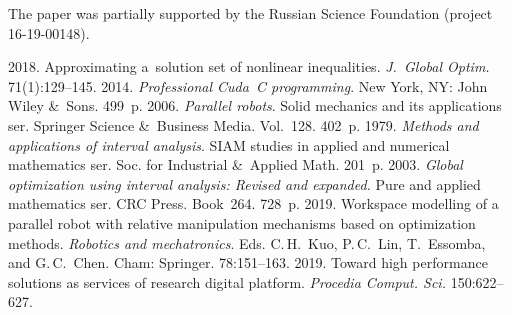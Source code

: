 




\Ack
\noindent
The paper was partially supported by the Russian Science Foundation  (project  16-19-00148).


 \begin{multicols}{2}

\renewcommand{\bibname}{\protect\rmfamily References}

{\small\frenchspacing
 {%
 \begin{thebibliography}{9}
 2018. Approximating 
a~solution set of nonlinear inequalities. \textit{J.~Global Optim.} 71(1):129--145. 
 2014. \textit{Professional Cuda~C programming}. 
New York, NY: John Wiley \&~Sons. 499~p.
 2006. \textit{Parallel robots}. 
Solid mechanics and its  
applications ser.
Springer Science \&~Business Media. Vol.~128. 402~p.
 1979. 
\textit{Methods and applications of interval analysis}.
 SIAM studies in applied and numerical mathematics ser.
{Soc. for Industrial \&~Applied Math.} 201~p.
 2003. 
\textit{Global optimization using interval analysis: Revised 
and expanded.} Pure and applied mathematics ser.
CRC Press. Book~264. 728~p.
 2019. Workspace modelling of a parallel 
robot with relative manipulation mechanisms based on optimization methods. 
\textit{Robotics and 
mechatronics}. Eds. C.\,H.~Kuo, P.\,C.~Lin, T.~Essomba, 
and G.\,C.~Chen. Cham: Springer. 78:151--163.
2019. Toward high performance solutions as services of research digital
 platform. \textit{Procedia Comput. 
Sci.} 150:622--627.
\end{thebibliography}

 }
 }

\end{multicols}

